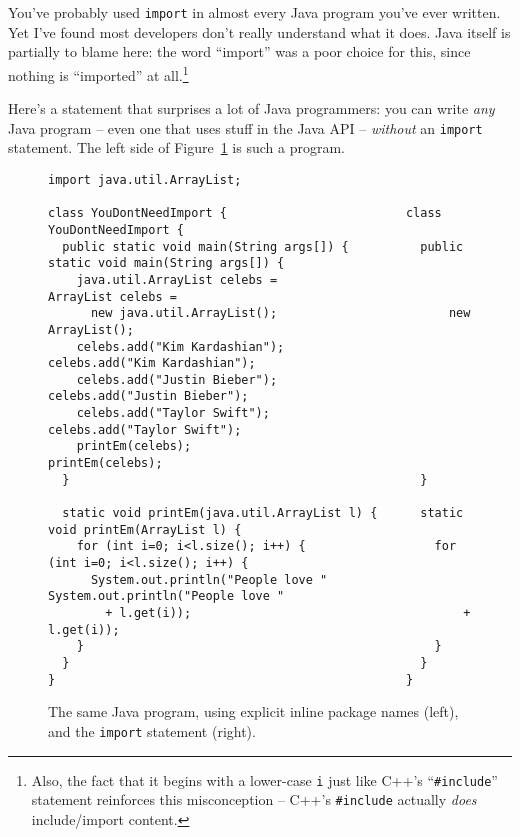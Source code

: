 You've probably used \texttt{import} in almost every Java program you've ever
written. Yet I've found most developers don't really understand what it does.
Java itself is partially to blame here: the word ``import'' was a poor choice
for this, since nothing is ``imported'' at all.\footnote{Also, the fact that
it begins with a lower-case \texttt{i} just like C++'s ``\texttt{\#include}''
statement reinforces this misconception -- C++'s \texttt{\#include} actually
\textit{does} include/import content.}

Here's a statement that surprises a lot of Java programmers: you can write
\textit{any} Java program -- even one that uses stuff in the Java API --
\textit{without} an \texttt{import} statement. The left side of
Figure~\ref{fig:dontNeedImport} is such a program.

\begin{figure}[ht]
\begin{Verbatim}[fontsize=\scriptsize,samepage=true,frame=single]
                                                  import java.util.ArrayList;

class YouDontNeedImport {                         class YouDontNeedImport {                                                 
  public static void main(String args[]) {          public static void main(String args[]) {
    java.util.ArrayList celebs =                      ArrayList celebs =
      new java.util.ArrayList();                        new ArrayList();
    celebs.add("Kim Kardashian");                     celebs.add("Kim Kardashian");
    celebs.add("Justin Bieber");                      celebs.add("Justin Bieber");
    celebs.add("Taylor Swift");                       celebs.add("Taylor Swift");
    printEm(celebs);                                  printEm(celebs);
  }                                                 }
                                                
  static void printEm(java.util.ArrayList l) {      static void printEm(ArrayList l) {
    for (int i=0; i<l.size(); i++) {                  for (int i=0; i<l.size(); i++) {
      System.out.println("People love "                 System.out.println("People love "
        + l.get(i));                                      + l.get(i));
    }                                                 }
  }                                                 }
}                                                 }
\end{Verbatim}
\caption{The same Java program, using explicit inline package names (left),
and the \texttt{import} statement (right).}
\label{fig:dontNeedImport}
\end{figure}

